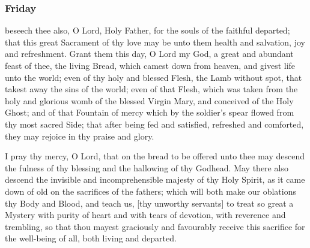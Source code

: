 \subsubsection{Friday}
 beseech thee also, O Lord, Holy Father, for the souls of the faithful departed; that this great Sacrament of thy love may be unto them health and salvation, joy and refreshment. Grant them this day, O Lord my God, a great and abundant feast of thee, the living Bread, which camest down from heaven, and givest life unto the world; even of thy holy and blessed Flesh, the Lamb without spot, that takest away the sins of the world; even of that Flesh, which was taken from the holy and glorious womb of the blessed Virgin Mary, and conceived of the Holy Ghost; and of that Fountain of mercy which by the soldier's spear flowed from thy most sacred Side; that after being fed and satisfied, refreshed and comforted, they may rejoice in thy praise and glory.
\par
I pray thy mercy, O Lord, that on the bread to be offered unto thee may descend the fulness of thy blessing and the hallowing of thy Godhead. May there also descend the invisible and incomprehensible majesty of thy Holy Spirit, as it came down of old on the sacrifices of the fathers; which will both make our oblations thy Body and Blood, and teach us, [thy unworthy servants] to treat so great a Mystery with purity of heart and with tears of devotion, with reverence and trembling, so that thou mayest graciously and favourably receive this sacrifice for the well-being of all, both living and departed. 

